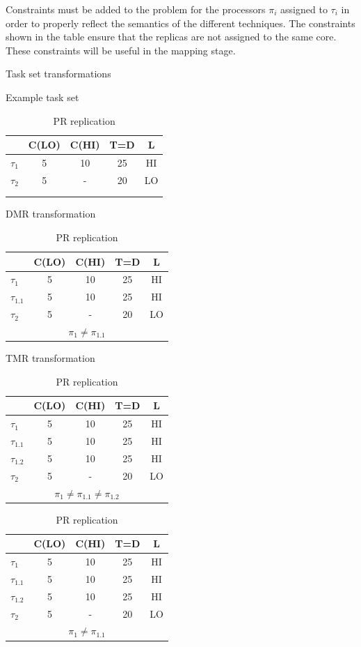 \documentclass[conference]{IEEEtran}
\begin{document}
	Constraints must be added to the problem for the processors $\pi_i$ assigned to $\tau_i$ in order to properly reflect the semantics of the different techniques. 
	The constraints shown in the table ensure that the replicas are not assigned to the same core. 
	These constraints will be useful in the mapping stage.
	
	
\begin{table}
\centering
\caption{Task set transformations}
\label{t:transform}
	\begin{subtable}{0.3\textwidth}
		\caption{Example task set}
		\begin{tabular}{@{}l|cccc@{}}
		\toprule
		& C(LO) & C(HI) & T=D & L 	 \\\bottomrule
		$\tau_1$ & 5 & 10 & 25 & HI  \\
		$\tau_2$ & 5 & - & 20 & LO  \\
		\multicolumn{5}{c}{ } \\
		\multicolumn{5}{c}{ } \\
		\end{tabular}
	\end{subtable} 
	\begin{subtable}{0.3\textwidth}
		\caption{DMR transformation}
		\begin{tabular}{@{}l|cccc@{}}
		\toprule
				& C(LO) & C(HI) & T=D & L	 \\\bottomrule
		$\tau_1$ & 5 & 10 & 25 & HI  \\
		$\tau_{1.1}$ & 5 & 10 & 25 & HI  \\
		$\tau_2$ & 5 & - & 20 & LO  \\
		\multicolumn{5}{c}{$\pi_1 \ne \pi_{1.1}$}
		\end{tabular}
	\end{subtable}
	\begin{subtable}{0.3\textwidth}
		\caption{TMR transformation}
		\begin{tabular}{@{}l|cccc@{}}
		\toprule
				& C(LO) & C(HI) & T=D & L	 \\\bottomrule
		$\tau_1$ & 5 & 10 & 25 & HI  \\
		$\tau_{1.1}$ & 5 & 10 & 25 & HI  \\
		$\tau_{1.2}$ & 5 & 10 & 25 & HI  \\
		$\tau_2$ & 5 & - & 20 & LO  \\
		\multicolumn{5}{c}{$\pi_1 \ne \pi_{1.1} \ne \pi_{1.2}$}
		\end{tabular}
	\end{subtable} 
	\begin{subtable}{0.3\textwidth}
		\caption{PR replication}
		\begin{tabular}{@{}l|cccc@{}}
		\toprule
		& C(LO) & C(HI) & T=D & L	 \\\bottomrule
		$\tau_1$ & 5 & 10 & 25 & HI  \\
		$\tau_{1.1}$ & 5 & 10 & 25 & HI  \\
		$\tau_{1.2}$ & 5 & 10 & 25 & HI  \\
		$\tau_2$ & 5 & - & 20 & LO  \\
		\multicolumn{5}{c}{$\pi_1 \ne \pi_{1.1}$}
		\end{tabular}
	\end{subtable}
\end{table}
\end{document}
